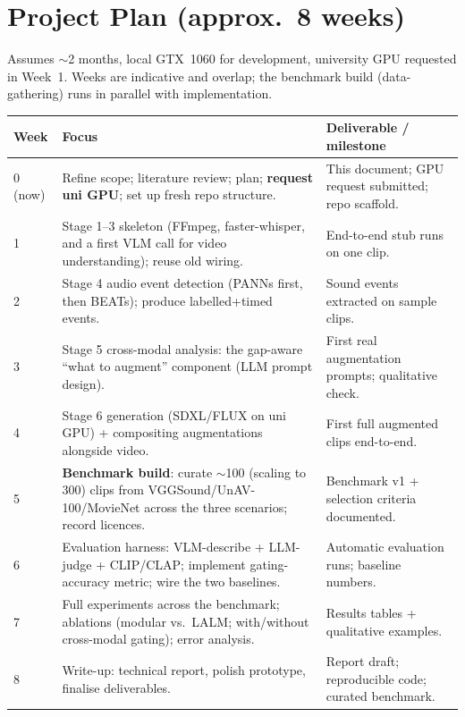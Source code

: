 \documentclass[11pt,a4paper]{article}
\begin{document}
\section{Project Plan (approx.\ 8 weeks)}\label{sec:plan}
Assumes $\sim$2 months, local GTX~1060 for development, university GPU requested in Week~1. Weeks are
indicative and overlap; the benchmark build (data-gathering) runs in parallel with implementation.

\begin{center}
\begin{longtable}{@{}p{1.5cm}p{6.4cm}p{5.2cm}@{}}
\toprule
\textbf{Week} & \textbf{Focus} & \textbf{Deliverable / milestone} \\
\midrule
\endhead
0 (now) & Refine scope; literature review; plan; \textbf{request uni GPU}; set up fresh repo structure.
  & This document; GPU request submitted; repo scaffold. \\
1 & Stage 1--3 skeleton (FFmpeg, faster-whisper, and a first VLM call for video understanding);
    reuse old wiring. & End-to-end stub runs on one clip. \\
2 & Stage 4 audio event detection (PANNs first, then BEATs); produce labelled+timed events. &
    Sound events extracted on sample clips. \\
3 & Stage 5 cross-modal analysis: the gap-aware ``what to augment'' component (LLM prompt design). &
    First real augmentation prompts; qualitative check. \\
4 & Stage 6 generation (SDXL/FLUX on uni GPU) + compositing augmentations alongside video. &
    First full augmented clips end-to-end. \\
5 & \textbf{Benchmark build}: curate $\sim$100 (scaling to 300) clips from VGGSound/UnAV-100/MovieNet
    across the three scenarios; record licences. & Benchmark v1 + selection criteria documented. \\
6 & Evaluation harness: VLM-describe + LLM-judge + CLIP/CLAP; implement gating-accuracy metric;
    wire the two baselines. & Automatic evaluation runs; baseline numbers. \\
7 & Full experiments across the benchmark; ablations (modular vs.\ LALM; with/without cross-modal
    gating); error analysis. & Results tables + qualitative examples. \\
8 & Write-up: technical report, polish prototype, finalise deliverables. &
    Report draft; reproducible code; curated benchmark. \\
\bottomrule
\end{longtable}
\end{center}
\end{document}
